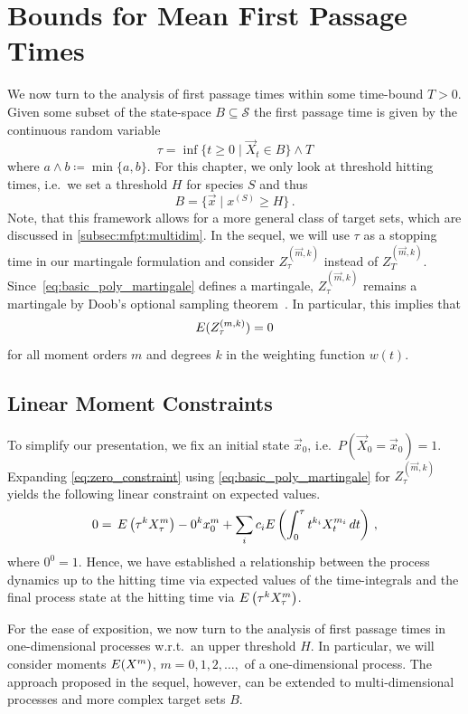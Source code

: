 \section{Bounds for Mean First Passage Times}\label{sec:mfpt:mfpt_bounds}
We now turn to the analysis of first passage times within some time-bound
$T>0$. Given some subset of the state-space
$B\subseteq \mathcal{S}$ the first passage time is given by the continuous random variable 
\[
	\tau = \inf\{t\geq 0\mid \vec X_t \in B\} \land T
\]
where $a \land b \coloneqq \min\{a, b\}$.
For this chapter, we only look at threshold hitting times,
i.e.\ we set a threshold $H$ for species $S$ and thus 
\[
	B=\{\vec{x}\mid x^{(S)}\geq H\}\,.
\]
Note, that this framework
allows for a more general class of target sets, which are discussed in
\autoref{subsec:mfpt:multidim}.
In the sequel, we will use $\tau$ as a stopping time in our martingale
formulation and consider
$Z_\tau^{(\vec m, k)}$ instead of $Z_T^{(\vec m, k)}$.
Since~\eqref{eq:basic_poly_martingale} defines a martingale, $Z_{\tau}^{(\vec m, k)}$
remains a martingale by
Doob's optional sampling theorem~\cite{gihmantheory}. In particular, this
implies that 
\begin{equation}\label{eq:zero_constraint}
	{E}(Z_{\tau}^{(m, k)})=0
\end{equation}
for all moment orders $m$ and
degrees $k$ in the weighting function $w(t)$.

\subsection{Linear Moment Constraints}
To simplify our presentation, we fix an initial state $\vec x_0$, i.e.\ $P(\vec X_0=\vec x_0)=1$.
Expanding \eqref{eq:zero_constraint} using
\eqref{eq:basic_poly_martingale} for $Z_{\tau}^{(\vec m, k)}$
yields the following linear constraint on expected values.
\begin{equation}\label{eq:constraint}
    0 = \,{E}\left({\tau}^kX_{\tau}^{m}\right)
        - 0^kx_0^{m}
        + \sum_{i}c_i{E}\left(\int_{0}^{\tau} t^{k_i} X_t^{m_i}\,dt\right)\,,
\end{equation}
where $0^0=1$.
Hence, we have established a relationship between the process dynamics
up to the hitting time via expected values of the time-integrals and the final process state at
the hitting time via ${E}\left(\tau^k {X}_{\tau}^{{m}}\right)$.

For the ease of exposition, we now turn to the analysis of first passage times in
one-dimensional processes w.r.t.\ an upper threshold $H$. In particular,
we will consider  moments ${E}(X^m)$, $m=0,1,2,\dots,$ of a one-dimensional process.
The   approach proposed in the sequel, however,
can be extended to multi-dimensional processes and more complex target sets $B$.

